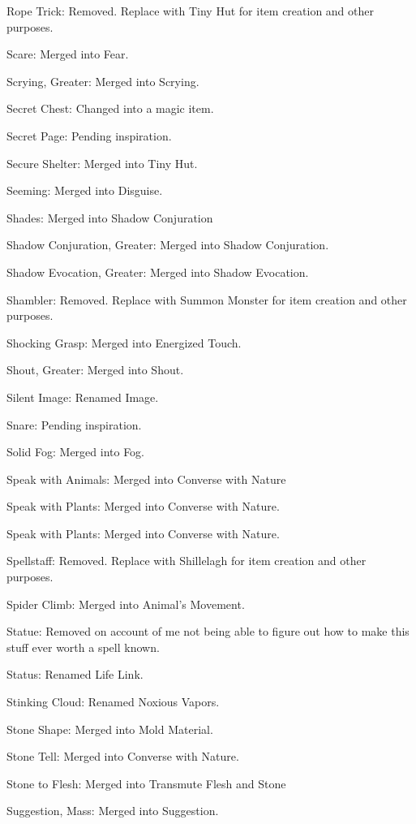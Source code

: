 {\begin{list}{}{\leftmargin=1em}
 \item Rope Trick: Removed. Replace with Tiny Hut for item creation and other purposes.
 \item Scare: Merged into Fear.
 \item Scrying, Greater: Merged into Scrying.
 \item Secret Chest: Changed into a magic item.
 \item Secret Page: Pending inspiration.
 \item Secure Shelter: Merged into Tiny Hut.
 \item Seeming: Merged into Disguise.
 \item Shades: Merged into Shadow Conjuration
 \item Shadow Conjuration, Greater: Merged into Shadow Conjuration.
 \item Shadow Evocation, Greater: Merged into Shadow Evocation.
 \item Shambler: Removed. Replace with Summon Monster for item creation and other purposes.
 \item Shocking Grasp: Merged into Energized Touch.
 \item Shout, Greater: Merged into Shout.
 \item Silent Image: Renamed Image.
 \item Snare: Pending inspiration.
 \item Solid Fog: Merged into Fog.
 \item Speak with Animals: Merged into Converse with Nature
 \item Speak with Plants: Merged into Converse with Nature.
 \item Speak with Plants: Merged into Converse with Nature.
 \item Spellstaff: Removed. Replace with Shillelagh for item creation and other purposes.
 \item Spider Climb: Merged into Animal's Movement.
 \item Statue: Removed on account of me not being able to figure out how to make this stuff ever worth a spell known.
 \item Status: Renamed Life Link.
 \item Stinking Cloud: Renamed Noxious Vapors.
 \item Stone Shape: Merged into Mold Material.
 \item Stone Tell: Merged into Converse with Nature.
 \item Stone to Flesh: Merged into Transmute Flesh and Stone
 \item Suggestion, Mass: Merged into Suggestion.

\end{list}}
